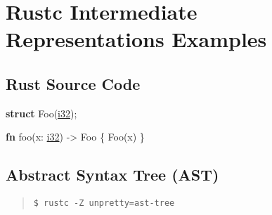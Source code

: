 \documentclass[
  11pt,
  twoside]{report}
\newenvironment{Shaded}{}{}
\newcommand{\DataTypeTok}[1]{\underline{#1}}
\newcommand{\KeywordTok}[1]{\textbf{#1}}
\newcommand{\NormalTok}[1]{#1}
\newcommand{\OperatorTok}[1]{#1}
\begin{document}
\cleardoublepage

\chapter{Rustc Intermediate Representations
Examples}\label{sec:rustc-intermediate-representations-examples}

\section{Rust Source Code}\label{sec:rust-source-code}

\begin{Shaded}
\begin{Highlighting}[]
\KeywordTok{struct}\NormalTok{ Foo(}\DataTypeTok{i32}\NormalTok{)}\OperatorTok{;}

\KeywordTok{fn}\NormalTok{ foo(x}\OperatorTok{:} \DataTypeTok{i32}\NormalTok{) }\OperatorTok{{-}\textgreater{}}\NormalTok{ Foo }\OperatorTok{\{}
\NormalTok{    Foo(x)}
\OperatorTok{\}}
\end{Highlighting}
\end{Shaded}

\section{Abstract Syntax Tree (AST)}\label{sec:abstract-syntax-tree-ast}

\begin{quote}
\texttt{\$\ rustc\ -Z\ unpretty=ast-tree}
\end{quote}
\end{document}
